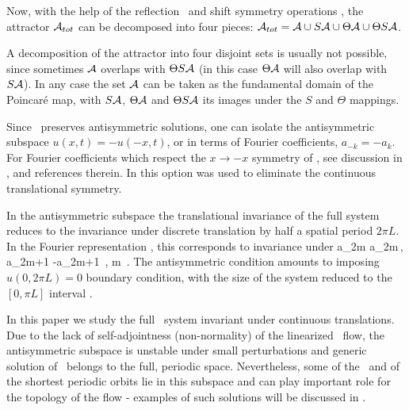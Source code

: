 Now, with the help of the 
reflection \Refl\ and shift symmetry {\Shift}
operations
,
the  attractor ${\cal A}_{tot}$ can be decomposed into four pieces:
 ${\cal A}_{tot}={\cal A} \cup S {\cal A}  \cup \Theta {\cal A}
  \cup \Theta S {\cal A} $. 

A decomposition
of the attractor into four disjoint sets
is usually not possible, since sometimes $ {\cal A}$ overlaps with
$\Theta S{\cal A} $ (in this case $\Theta  {\cal A}$ will also  overlap with
$S {\cal A} $).
In any case  the set $ {\cal A}$ can be taken as
the fundamental
domain of the Poincar{\'e} map, with $S  {\cal A} $,
$\Theta  {\cal A} $ and $\Theta S  {\cal A} $ its images under the
$S$ and $\Theta$ mappings.



Since \KSe\ preserves
antisymmetric solutions, one can isolate the antisymmetric
subspace 
$u(x,t)=-u(-x,t)$, or in terms of Fourier coefficients,
$a_{-k}= - a_k$. 
For Fourier coefficients which respect the $x \to -x$ symmetry of
\KSe, see discussion in ,
and references therein.
In  
this option was used to eliminate
the continuous translational symmetry.

In the antisymmetric subspace the translational 
invariance of the full system reduces
to the invariance under discrete
translation by half a spatial period $2\pi L$.
In the Fourier representation , 
this corresponds to invariance under 
\beq
a_{2m} \to a_{2m}\,, a_{2m+1} \to -a_{2m+1}
\,, m \in {}
\,.
The antisymmetric condition amounts to imposing
$u(0,2\pi L)=0$ boundary condition, with
the size of the system reduced to
the $[0, \pi L]$ interval 
.

In this paper we study the full \KS\ system invariant
under continuous translations. Due to the lack of self-adjointness
(non-normality) of the linearized \KS\ flow, 
the antisymmetric subspace
is unstable under small perturbations and generic solution of 
\KSe\ belongs to the full, periodic space. Nevertheless, some of
the \eqva\ and of the shortest periodic orbits lie in this subspace
and can play important role for the topology of the flow - examples
of such solutions will be discussed in .


